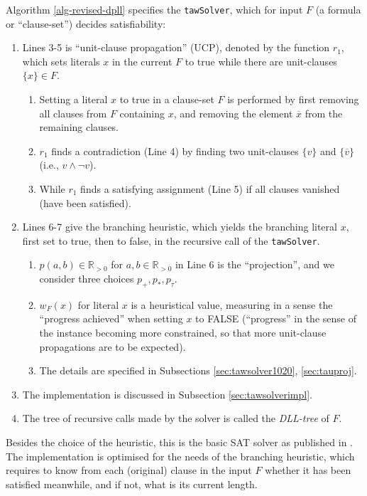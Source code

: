 \documentclass[final,3p,times]{elsarticle}
\theoremstyle{definition}
\newcommand{\set}[1]{\{#1\}}
\newcommand{\ol}{\overline}
\newcommand{\RR}{\mathbb{R}}
\newcommand{\tawsolver}{\texttt{tawSolver}}
\begin{document}
Algorithm \ref{alg-revised-dpll} specifies the \tawsolver, which for input $F$ (a formula or ``clause-set'') decides satisfiability:
\begin{enumerate}
\item Lines 3-5 is ``unit-clause propagation'' (UCP), denoted by the function $r_1$, which sets literals $x$ in the current $F$ to true while there are unit-clauses $\set{x} \in F$.
  \begin{enumerate}
  \item Setting a literal $x$ to true in a clause-set $F$ is performed by first removing all clauses from $F$ containing $x$, and removing the element $\ol{x}$ from the remaining clauses.
\item $r_1$ finds a contradiction (Line 4) by finding two unit-clauses $\set{v}$ and $\set{\ol{v}}$ (i.e., $v \wedge \neg v$).
\item While $r_1$ finds a satisfying assignment (Line 5) if all clauses vanished (have been satisfied).
  \end{enumerate}
\item Lines 6-7 give the branching heuristic, which yields the branching literal $x$, first set to true, then to false, in the recursive call of the \tawsolver.
  \begin{enumerate}
  \item $p(a,b) \in \RR_{>0}$ for $a,b \in \RR_{>0}$ in Line 6 is the ``projection'', and we consider three choices $p_+, p_*, p_{\tau}$.
  \item $w_F(x)$ for literal $x$ is a heuristical value, measuring in a sense the ``progress achieved'' when setting $x$ to FALSE (``progress'' in the sense of the instance becoming more constrained, so that more unit-clause propagations are to be expected).
  \item The details are specified in Subsections \ref{sec:tawsolver1020}, \ref{sec:tauproj}.
  \end{enumerate}
\item The implementation is discussed in Subsection \ref{sec:tawsolverimpl}.
\item The tree of recursive calls made by the solver is called the {\it DLL-tree} of $F$.
\end{enumerate}
Besides the choice of the heuristic, this is the basic SAT solver as published in \cite{dpll}. The implementation is optimised for the needs of the branching heuristic, which requires to know from each (original) clause in the input $F$ whether it has been satisfied meanwhile, and if not, what is its current length.
\end{document}
